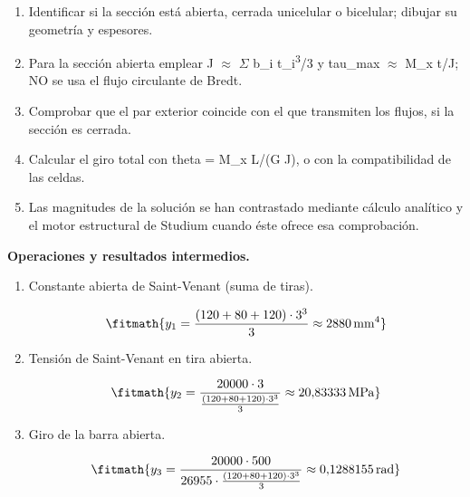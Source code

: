 \begin{enumerate}

\item Identificar si la sección está abierta, cerrada unicelular o bicelular; dibujar su geometría y espesores.

\item Para la sección abierta emplear J \ensuremath{\approx} \ensuremath{\Sigma} b\_i t\_i\textsuperscript{3}/3 y tau\_max \ensuremath{\approx} M\_x t/J; NO se usa el flujo circulante de Bredt.

\item Comprobar que el par exterior coincide con el que transmiten los flujos, si la sección es cerrada.

\item Calcular el giro total con theta = M\_x L/(G J), o con la compatibilidad de las celdas.

\item Las magnitudes de la solución se han contrastado mediante cálculo analítico y el motor estructural de Studium cuando éste ofrece esa comprobación.

\end{enumerate}

\noindent\textbf{Operaciones y resultados intermedios.}

\begin{enumerate}

\item Constante abierta de Saint-Venant (suma de tiras).

\[\fitmath{y_{1}=\frac{\left(120+80+120\right)\cdot {3}^{3}}{3}\approx 2880\,\mathrm{mm^{4}}}\]

\item Tensión de Saint-Venant en tira abierta.

\[\fitmath{y_{2}=\frac{20000\cdot 3}{\frac{\left(120+80+120\right)\cdot {3}^{3}}{3}}\approx 20{,}83333\,\mathrm{MPa}}\]

\item Giro de la barra abierta.

\[\fitmath{y_{3}=\frac{20000\cdot 500}{26955\cdot \frac{\left(120+80+120\right)\cdot {3}^{3}}{3}}\approx 0{,}1288155\,\mathrm{rad}}\]

\end{enumerate}
